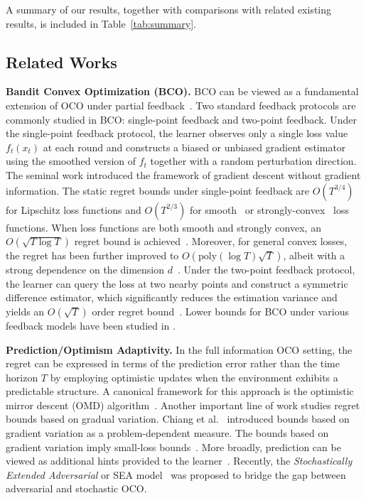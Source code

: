 \documentclass[journal,onecolumn]{IEEEtran}
\theoremstyle{plain}
\theoremstyle{definition}
\theoremstyle{remark}
\begin{document}
A summary of our results, together with  comparisons with related existing results, is included in Table~\ref{tab:summary}.

\subsection{Related Works}
\textbf{Bandit Convex Optimization (BCO).} BCO can be viewed as a fundamental extension of OCO under partial feedback~\cite{lattimore2024bandit}. Two standard feedback protocols are commonly studied in BCO: single-point feedback and two-point feedback. Under the single-point feedback protocol, the learner observes only a single loss value $f_t(x_t)$ at each round and constructs a biased or unbiased gradient estimator using the smoothed version of $f_t$ together with a random perturbation direction. The seminal work \cite{flaxman2004online} introduced the framework of gradient descent without gradient information. The static regret bounds under single-point feedback are $O(T^{3/4})$~\cite{flaxman2004online} for Lipschitz loss functions and $O(T^{2/3})$ for smooth~\cite{saha2011improved} or strongly-convex~\cite{agarwal2010optimal} loss functions. When loss functions are both smooth and strongly convex, an $O(\sqrt{T\log T})$ regret bound is achieved~\cite{hazan2014bandit}. Moreover, for general convex losses, the regret has been further improved to $O(\mathrm{poly}(\log T)\sqrt{T})$, albeit with a strong dependence on the dimension $d$~\cite{bubeck2015bandit,bubeck2021kernel,lattimore2020improved}. Under the two-point feedback protocol, the learner can query the loss at two nearby points and construct a symmetric difference estimator, which significantly reduces the estimation variance and yields an $O(\sqrt{T})$ order regret bound~\cite{shamir2017optimal}. Lower bounds for BCO under various feedback models have been studied in \cite{shamir2013complexity,hu2016bandit}. 

\textbf{Prediction/Optimism Adaptivity.} In the full information OCO
setting, the regret can be expressed in terms of the prediction error rather than the time horizon $T$ by employing optimistic updates when the environment exhibits a predictable structure. A canonical framework for this approach is the optimistic mirror descent (OMD) algorithm~\cite{rakhlin2013online,rakhlin2013optimization}. Another important line of work studies regret bounds based on gradual variation. Chiang et al.~\cite{chiang2012online} introduced bounds based on gradient variation as a problem-dependent measure. The bounds based on gradient variation imply small-loss bounds~\cite{zhao2024adaptivity}. More broadly, prediction can be viewed as additional hints provided to the learner~\cite{dekel2017online,bhaskara2020online}. Recently, the {\em Stochastically Extended Adversarial} or SEA  model~\cite{sachs2023accelerated} was proposed to bridge the gap between adversarial and stochastic OCO.
\end{document}
